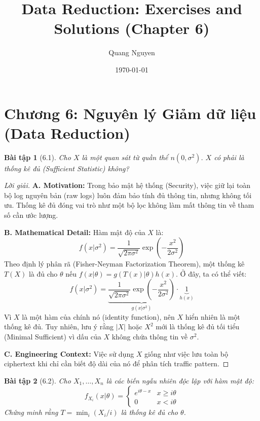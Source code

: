 \documentclass[8pt,a4paper]{article}
\title{Data Reduction: Exercises and Solutions (Chapter 6)}
\author{Quang Nguyen}
\date{\today}
\newtheorem{exercise}{Bài tập}
\newenvironment{solution}{\begin{proof}[Lời giải]}{\end{proof}}
\begin{document}
\maketitle

\section*{Chương 6: Nguyên lý Giảm dữ liệu (Data Reduction)}

\begin{exercise}[6.1]
Cho $X$ là một quan sát từ quần thể $n(0, \sigma^2)$. $X$ có phải là thống kê đủ (Sufficient Statistic) không?
\end{exercise}

\begin{solution}
\textbf{A. Motivation:} Trong bảo mật hệ thống (Security), việc giữ lại toàn bộ log nguyên bản (raw logs) luôn đảm bảo tính đủ thông tin, nhưng không tối ưu. Thống kê đủ đóng vai trò như một bộ lọc không làm mất thông tin về tham số cần ước lượng.

\textbf{B. Mathematical Detail:}
Hàm mật độ của $X$ là:
\[ f(x|\sigma^2) = \frac{1}{\sqrt{2\pi\sigma^2}} \exp\left(-\frac{x^2}{2\sigma^2}\right) \]
Theo định lý phân rã (Fisher-Neyman Factorization Theorem), một thống kê $T(X)$ là đủ cho $\theta$ nếu $f(x|\theta) = g(T(x)|\theta)h(x)$.
Ở đây, ta có thể viết:
\[ f(x|\sigma^2) = \underbrace{\frac{1}{\sqrt{2\pi\sigma^2}} \exp\left(-\frac{x^2}{2\sigma^2}\right)}_{g(x|\sigma^2)} \cdot \underbrace{1}_{h(x)} \]
Vì $X$ là một hàm của chính nó (identity function), nên $X$ hiển nhiên là một thống kê đủ. Tuy nhiên, lưu ý rằng $|X|$ hoặc $X^2$ mới là thống kê đủ tối tiểu (Minimal Sufficient) vì dấu của $X$ không chứa thông tin về $\sigma^2$.

\textbf{C. Engineering Context:} Việc sử dụng $X$ giống như việc lưu toàn bộ ciphertext khi chỉ cần biết độ dài của nó để phân tích traffic pattern.
\end{solution}

\begin{exercise}[6.2]
Cho $X_1, \dots, X_n$ là các biến ngẫu nhiên độc lập với hàm mật độ:
\[ f_{X_i}(x|\theta) = \begin{cases} e^{i\theta-x} & x \ge i\theta \\ 0 & x < i\theta \end{cases} \]
Chứng minh rằng $T = \min_i(X_i/i)$ là thống kê đủ cho $\theta$.
\end{exercise}
\end{document}
